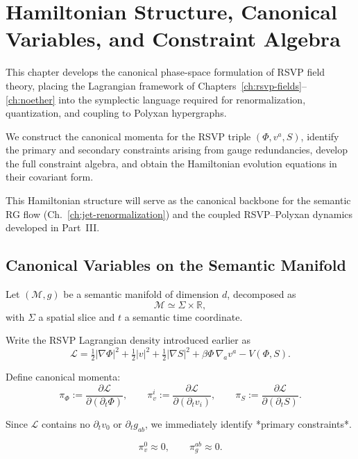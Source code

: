 \chapter{Hamiltonian Structure, Canonical Variables, and Constraint Algebra}
\label{ch:hamiltonian}

This chapter develops the canonical phase-space formulation of RSVP field
theory, placing the Lagrangian framework of
Chapters~\ref{ch:rsvp-fields}–\ref{ch:noether} into the symplectic
language required for renormalization, quantization, and coupling to
Polyxan hypergraphs.

We construct the canonical momenta for the RSVP triple
$(\Phi, v^a, S)$, identify the primary and secondary constraints arising
from gauge redundancies, develop the full constraint algebra, and obtain
the Hamiltonian evolution equations in their covariant form.

This Hamiltonian structure will serve as the canonical backbone for the
semantic RG flow (Ch.~\ref{ch:jet-renormalization}) and the coupled RSVP–Polyxan
dynamics developed in Part~III.

\section{Canonical Variables on the Semantic Manifold}

Let $(\mathcal{M},g)$ be a semantic manifold of dimension $d$,
decomposed as
\[
\mathcal{M} \simeq \Sigma \times \mathbb{R},
\]
with $\Sigma$ a spatial slice and $t$ a semantic time coordinate.

Write the RSVP Lagrangian density introduced earlier as
\[
\mathcal{L} = \tfrac{1}{2} |\nabla \Phi|^2
             + \tfrac{1}{2} |v|^2
             + \tfrac{1}{2} |\nabla S|^2
             + \beta \Phi\, \nabla_a v^a
             - V(\Phi,S).
\]

Define canonical momenta:
\[
\pi_\Phi := \frac{\partial \mathcal{L}}{\partial (\partial_t \Phi)}, \qquad
\pi^i_v := \frac{\partial \mathcal{L}}{\partial (\partial_t v_i)}, \qquad
\pi_S := \frac{\partial \mathcal{L}}{\partial (\partial_t S)}.
\]

Since $\mathcal{L}$ contains no $\partial_t v_0$ or $\partial_t g_{ab}$,
we immediately identify *primary constraints*.

\[
\pi^0_v \approx 0, \qquad
\pi^{ab}_g \approx 0.
\]

